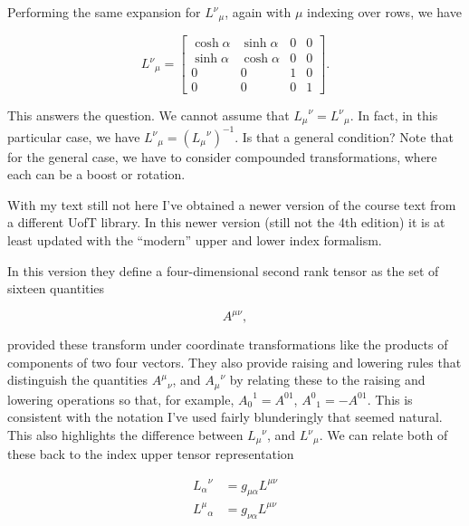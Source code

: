 Performing the same expansion for ${L^\nu}_\mu$, again with $\mu$ indexing over rows, we have

\begin{equation}\label{eqn:antisymmetricTensorTx:470}
{L^\nu}_\mu =
\begin{bmatrix}
\cosh \alpha & \sinh \alpha & 0 & 0 \\
\sinh \alpha & \cosh \alpha & 0 & 0 \\
0 & 0 & 1 & 0 \\
0 & 0 & 0 & 1
\end{bmatrix}.
\end{equation}

This answers the question.  We cannot assume that ${L_\mu}^\nu = {L^\nu}_\mu$.  In fact, in this particular case, we have ${L^\nu}_\mu = ({L_\mu}^\nu)^{-1}$.  Is that a general condition?  Note that for the general case, we have to consider compounded transformations, where each can be a boost or rotation.

With my text still not here I've obtained a newer version of the course text from a different UofT library.  In this newer version \citep{landau1971classical} (still not the 4th edition) it is at least updated with the ``modern'' upper and lower index formalism.

In this version they define a four-dimensional second rank tensor as the set of sixteen quantities

\begin{equation}\label{eqn:antisymmetricTensorTx:471}
A^{\mu\nu},
\end{equation}

provided these transform under coordinate transformations like the products of components of two four vectors.  They also provide raising and lowering rules that distinguish the quantities ${A^{\mu}}_\nu$, and ${A_{\mu}}^\nu$ by relating these to the raising and lowering operations so that, for example, ${A_0}^1 = A^{01}$, ${A^0}_1 = -A^{01}$.  This is consistent with the notation I've used fairly blunderingly that seemed natural.  This also highlights the difference between ${L_\mu}^\nu$, and ${L^\nu}_\mu$.  We can relate both of these back to the index upper tensor representation

\begin{align}\label{eqn:antisymmetricTensorTx:472}
{L_\alpha}^\nu &= g_{\mu \alpha} L^{\mu \nu} \\
{L^\mu}_\alpha &= g_{\nu \alpha} L^{\mu \nu}
\end{align}

